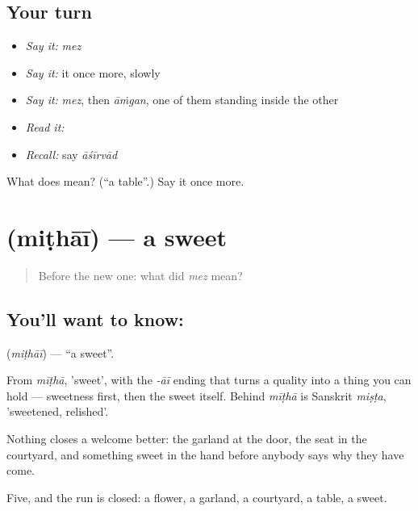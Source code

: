 \subsection*{Your turn}
\begin{itemize}
\raggedright
  \item \emph{Say it:} \emph{mez}
  \item \emph{Say it:} it once more, slowly
  \item \emph{Say it:} \emph{mez}, then \emph{āṁgan}, one of them standing inside the other
  \item \emph{Read it:} \textbf{}
  \item \emph{Recall:} say \emph{āśīrvād}
\end{itemize}

\begin{tcolorbox}[breakable,colback=teal!4,colframe=teal!35!black,title={Before you move on}]
What does  mean? (\textquotedblleft{}a table\textquotedblright{}.) Say it once more.
\end{tcolorbox}
\section[\texorpdfstring{\hi{मिठाई} (miṭhāī)}{मिठाई (miṭhāī)}]{ (miṭhāī) — a sweet}

\label{lesson:HI-C51-sweet}



\begin{quote}
Before the new one: what did \emph{mez} mean?
\end{quote}

\subsection*{You'll want to know: }
\textbf{} (\emph{miṭhāī}) — \textquotedblleft{}a sweet\textquotedblright{}.

From \emph{mīṭhā}, 'sweet', with the \emph{-āī} ending that turns a quality into a thing you can hold — sweetness first, then the sweet itself. Behind \emph{mīṭhā} is Sanskrit \emph{miṣṭa}, 'sweetened, relished'.

Nothing closes a welcome better: the garland at the door, the seat in the courtyard, and something sweet in the hand before anybody says why they have come.

\begin{grammarlens}[title={What you've built}]
Five, and the run is closed: a flower, a garland, a courtyard, a table, a sweet.
\end{grammarlens}


